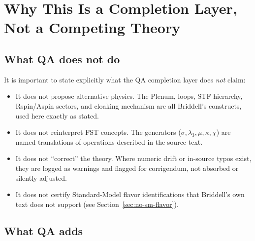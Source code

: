 \documentclass[12pt,a4paper]{article}
\begin{document}

\section{Why This Is a Completion Layer, Not a Competing Theory}

\subsection{What QA does not do}

It is important to state explicitly what the QA completion layer
does \emph{not} claim:
\begin{itemize}[nosep]
  \item It does not propose alternative physics. The Plenum, loops,
        STF hierarchy, Rspin/Aspin sectors, and cloaking mechanism
        are all Briddell's constructs, used here exactly as stated.
  \item It does not reinterpret FST concepts. The generators
        ($\sigma, \lambda_3, \mu, \kappa, \chi$) are named translations
        of operations described in the source text.
  \item It does not ``correct'' the theory. Where numeric drift or
        in-source typos exist, they are logged as warnings and
        flagged for corrigendum, not absorbed or silently adjusted.
  \item It does not certify Standard-Model flavor identifications
        that Briddell's own text does not support (see
        Section~\ref{sec:no-sm-flavor}).
\end{itemize}

\subsection{What QA adds}
\end{document}
